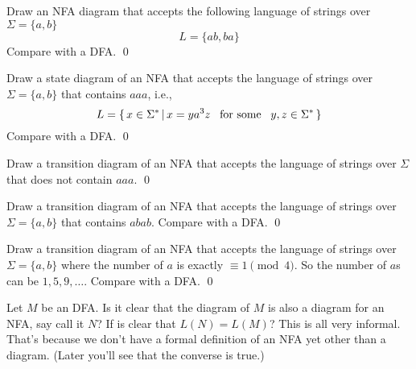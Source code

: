 \newpage
\begin{ex}
Draw an NFA diagram that accepts the following
language of strings over $\Sigma =
\{ a, b \}$ 
\[
L = \{ab, ba\}
\]
Compare with a DFA.
\qed
\end{ex}


\newpage
\begin{ex}
Draw a state diagram of an NFA that accepts the language of
strings over $\Sigma = \{a,b\}$ that contains $aaa$, i.e.,
\[
 L = \{\, x \in \Sigma^*
 \,|\, x = ya^3z \text{ \, for some \, } y,z \in \Sigma^* \,\}
\]
Compare with a DFA.
\vspace{2in}
\qed
\end{ex}


\newpage
\begin{ex}
Draw a transition diagram of an NFA that accepts the language of
strings over $\Sigma$ that does not contain $aaa$.
\vspace{2in}
\qed
\end{ex}

\newpage
\begin{ex}
Draw a transition diagram of an NFA that accepts the language of
strings over $\Sigma = \{a,b\}$ that contains $abab$.
Compare with a DFA.
\vspace{2in}
\qed
\end{ex}

\newpage
\begin{ex}
Draw a transition diagram of an NFA that accepts the language of
strings over $\Sigma = \{a,b\}$ where the number of $a$ is exactly
$\equiv 1\pmod 4$. So the number of $a$s can be $1,5,9,\ldots$.
Compare with a DFA.
\vspace{2in}
\qed
\end{ex}

\newpage
\begin{ex}
  Let $M$ be an DFA.
  Is it clear that the diagram of $M$ is also a diagram
  for an NFA, say call it $N$?
  If is clear that $L(N) = L(M)$?
  This is all very informal.
  That's because we don't have a formal definition of an NFA
  yet other than a diagram.
  (Later you'll see that the converse is true.)
\end{ex}
